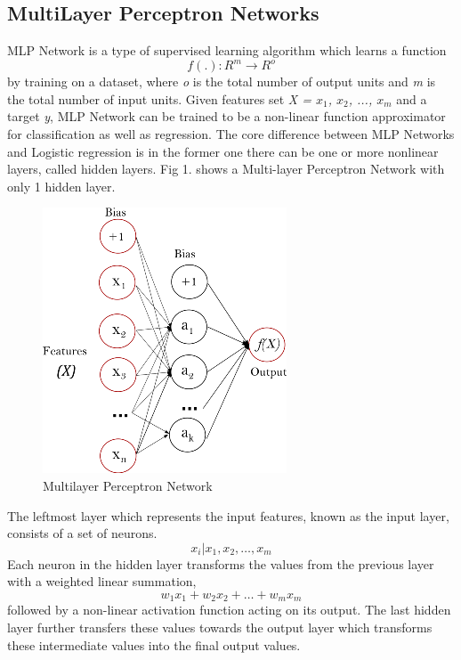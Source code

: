 \documentclass[a4paper, 10pt, conference]{IEEEtran}
\begin{document}
\subsection{MultiLayer Perceptron Networks}
MLP Network is a type of supervised learning algorithm which learns a function \[ f(.): R^{m} \rightarrow R^{o} \] by training on a dataset, where \textit{o} is the total number of output units and \textit{m} is the total number of input units. Given features set \textit{X = $x_{1}$, $x_{2}$, ..., $x_{m}$} and a target \textit{y},  MLP Network can be trained to be a non-linear function approximator for classification as well as regression. The core difference between MLP Networks and Logistic regression is in the former one there can be one or more nonlinear layers, called hidden layers. Fig 1. shows a Multi-layer Perceptron Network with only 1 hidden layer.
\begin{figure}
  \includegraphics[width=\linewidth]{MLP.png}
  \caption{Multilayer Perceptron Network}
  \label{fig:mlp}
\end{figure}

The leftmost layer which represents the input features, known as the input layer, consists of a set of neurons. \[ {x_{i}|x_{1},x_{2},\ldots,x_{m}} \]Each neuron in the hidden layer transforms the values from the previous layer with a weighted linear summation, \[ w_{1}x_{1} + w_{2}x_{2} + \ldots + w_{m}x_{m} \]
followed by a non-linear activation function acting on its output. The last hidden layer further transfers these values towards the output layer which transforms these intermediate values into the final output values.
\end{document}

